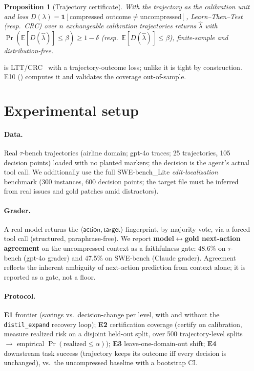 \documentclass{article}
\newtheorem{proposition}{Proposition}
\begin{document}
\begin{proposition}[Trajectory certificate]\label{prop:trajcert}
With the trajectory as the calibration unit and loss $D(\lambda)=\mathbf 1[\text{compressed
outcome}\neq\text{uncompressed}]$, Learn--Then--Test (resp.\ CRC) over $n$ exchangeable
calibration trajectories returns $\hat\lambda$ with
$\Pr(\mathbb E[D(\hat\lambda)]\le\beta)\ge1-\delta$ (resp.\ $\mathbb E[D(\hat\lambda)]\le\beta$),
finite-sample and distribution-free.
\end{proposition}
\noindent {} is LTT/CRC~\cite{ltt,crc} with a trajectory-outcome loss; unlike
 it is tight by construction. E10 () computes it and validates
the coverage out-of-sample.

\section{Experimental setup}
\paragraph{Data.} Real $\tau$-bench trajectories (airline domain; gpt-4o traces;
25 trajectories, 105 decision points) loaded with no planted markers; the decision
is the agent's actual tool call. We additionally use the full SWE-bench\_Lite
\emph{edit-localization} benchmark (300 instances, 600 decision points; the
target file must be inferred from real issues and gold patches amid distractors).
\paragraph{Grader.} A real model returns the
$\langle\textsf{action},\textsf{target}\rangle$ fingerprint, by majority vote, via a
forced tool call (structured, paraphrase-free). We report \textbf{model$\leftrightarrow$gold
next-action agreement} on the uncompressed context as a faithfulness gate: 48.6\%
on $\tau$-bench (gpt-4o grader) and 47.5\% on SWE-bench (Claude grader). Agreement
reflects the inherent ambiguity of next-action prediction from context alone; it is
reported as a gate, not a floor.
\paragraph{Protocol.} \textbf{E1} frontier (savings vs.\ decision-change per level,
with and without the \texttt{distil\_expand} recovery loop); \textbf{E2}
certification coverage (certify on calibration, measure realized risk on a disjoint
held-out split, over 500 trajectory-level splits $\to$ empirical
$\Pr(\text{realized}\le\alpha)$); \textbf{E3} leave-one-domain-out shift; \textbf{E4}
downstream task success (trajectory keeps its outcome iff every decision is
unchanged), vs.\ the uncompressed baseline with a bootstrap CI.
\end{document}
